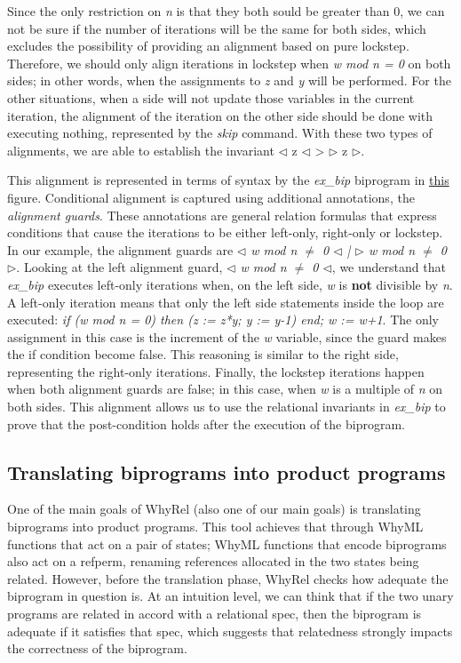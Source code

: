 Since the only restriction on \emph{n} is that they both sould be greater than 0, we can not be sure if the number of iterations will be the same for both sides, which excludes the possibility of providing an alignment based on pure lockstep.
Therefore, we should only align iterations in lockstep when \emph{w mod n = 0} on both sides; in other words, when the assignments to \emph{z} and \emph{y} will be performed.
For the other situations, when a side will not update those variables in the current iteration, the alignment of the iteration on the other side should be done with executing nothing, represented by the \emph{skip} command.
With these two types of alignments, we are able to establish the invariant $\lhd$ z $\lhd$ > $\rhd$ z $\rhd$.

This alignment is represented in terms of syntax by the \emph{ex\_bip} biprogram in \hyperref[fig:cond_align_loops_ex]{this} figure.
Conditional alignment is captured using additional annotations, the \emph{alignment guards}.
These annotations are general relation formulas that express conditions that cause the iterations to be either left-only, right-only or lockstep.
In our example, the alignment guards are \emph{$\lhd$ w mod n $\neq$ 0 $\lhd$ | $\rhd$ w mod n $\neq$ 0 $\rhd$}.
Looking at the left alignment guard, \emph{$\lhd$ w mod n $\neq$ 0 $\lhd$}, we understand that \emph{ex\_bip} executes left-only iterations when, on the left side, \emph{w} is \textbf{not} divisible by \emph{n}. 
A left-only iteration means that only the left side statements inside the loop are executed: \emph{if (w mod n = 0) then (z := z*y; y := y-1) end; w := w+1}.
The only assignment in this case is the increment of the \emph{w} variable, since the guard makes the if condition become false.
This reasoning is similar to the right side, representing the right-only iterations.
Finally, the lockstep iterations happen when both alignment guards are false; in this case, when \emph{w} is a multiple of \emph{n} on both sides.
This alignment allows us to use the relational invariants in \emph{ex\_bip} to prove that the post-condition holds after the execution of the biprogram.


\FloatBarrier
\subsection{Translating biprograms into product programs}
\label{subsec:whyrel_translation}

One of the main goals of WhyRel (also one of our main goals) is translating biprograms into product programs.
This tool achieves that through WhyML functions that act on a pair of states; WhyML functions that encode biprograms also act on a refperm, renaming references allocated in the two states being related.
However, before the translation phase, WhyRel checks how adequate the biprogram in question is.
At an intuition level, we can think that if the two unary programs are related in accord with a relational spec, then the biprogram is adequate if it satisfies that spec, which suggests that relatedness strongly impacts the correctness of the biprogram.

